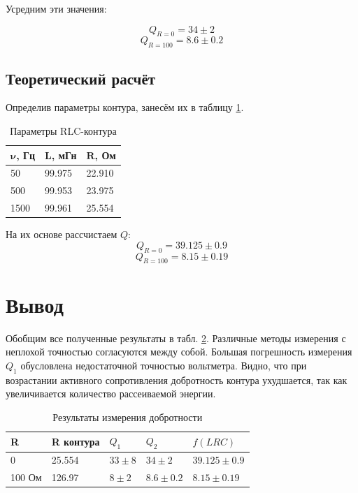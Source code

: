 \documentclass{lab}
\begin{document}
Усредним эти значения:

\begin{equation}
    Q_{R=0} = 34 \pm 2
\end{equation}
\begin{equation}
    Q_{R=100} = 8.6 \pm 0.2
\end{equation}

\subsection{Теоретический расчёт}

Определив параметры контура, занесём их в таблицу \ref{2}.

\begin{table}[h]
    \centering
    \begin{tabular}{|l|l|l|}
        \hline
        $\mathbf{\nu}${\bf,  Гц} & $\mathbf{L}${\bf, мГн} & $\mathbf{R}${\bf, Ом} \\ \hline
        50                       & 99.975                 & 22.910                \\ \hline
        500                      & 99.953                 & 23.975                \\ \hline
        1500                     & 99.961                 & 25.554                \\ \hline
    \end{tabular}
    \caption{Параметры RLC-контура}
    \label{2}
\end{table}

На их основе рассчистаем $Q$:
\begin{equation}
    Q_{R=0} = 39.125 \pm 0.9
\end{equation}
\begin{equation}
    Q_{R=100}=8.15 \pm 0.19
\end{equation}
\section{Вывод}

Обобщим все полученные результаты в табл. \ref{1}. Различные методы измерения с неплохой точностью согласуются между собой. Большая погрешность измерения $Q_1$ обусловлена недостаточной точностью вольтметра. Видно, что при возрастании активного сопротивления добротность контура ухудшается, так как увеличивается количество рассеиваемой энергии.
\begin{table}[h!]
    \centering
    \begin{tabular}{|l|l||l|l|l|}
        \hline
        R      & R контура & $Q_1$      & $Q_2$         & $f(LRC)$         \\ \hline
        0      & 25.554    & $33 \pm 8$ & $34 \pm 2$    & $39.125 \pm 0.9$ \\ \hline
        100 Ом & 126.97    & $8 \pm 2$  & $8.6 \pm 0.2$ & $8.15 \pm 0.19$  \\ \hline
    \end{tabular}
    \caption{Результаты измерения добротности}
    \label{1}
\end{table}
\end{document}
